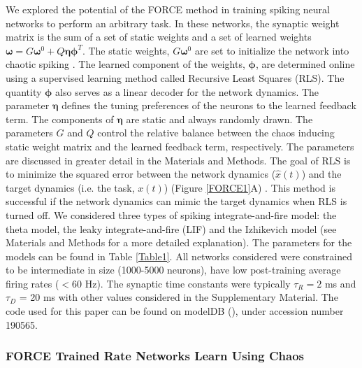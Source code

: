 \documentclass[11pt]{article} %
\begin{document}
We explored the potential of the FORCE method in training spiking neural networks to perform an arbitrary task.  In these networks, the synaptic weight matrix is the sum of a set of static weights and a set of learned weights $\bm \omega = G\bm{\omega}^0+Q\bm \eta \bm \phi^T$.   The static weights, $G\bm\omega^0$ are set to initialize the network into chaotic spiking  \cite{SOMP,OSTOJIC,Harish}.  The learned component of the weights, $\bm \phi$, are determined online using a supervised learning method called Recursive Least Squares (RLS).  The quantity $\bm \phi$ also serves as a linear decoder for the network dynamics.  The parameter $\bm \eta$ defines the tuning preferences of the neurons to the learned feedback term.  The components of $\bm\eta$ are static and always randomly drawn.  The parameters $G$ and $Q$ control the relative balance between the chaos inducing static weight matrix and the learned feedback term, respectively.  The parameters are discussed in greater detail in the Materials and Methods. The goal of RLS is to minimize the squared error between the network dynamics ($\hat{x}(t)$) and the target dynamics (i.e. the task, $x(t)$) (Figure \ref{FORCE1}A) \cite{haykin,bishop}.  This method is successful if the network dynamics can mimic the target dynamics when RLS is turned off.   We considered three types of spiking integrate-and-fire model: the theta model, the leaky integrate-and-fire (LIF) and the Izhikevich model (see Materials and Methods for a more detailed explanation).  The parameters for the models can be found in Table \ref{Table1}.  All networks considered were constrained to be intermediate in size (1000-5000 neurons), have low post-training average firing rates ($<60$ Hz).  The synaptic time constants were typically $\tau_R = 2$ ms and $\tau_D$ = 20 ms with other values considered in the Supplementary Material.   The code used for this paper can be found on modelDB (\cite{modeldb}), under accession number 190565.


\subsubsection*{FORCE Trained Rate Networks Learn Using Chaos} 
\end{document}

